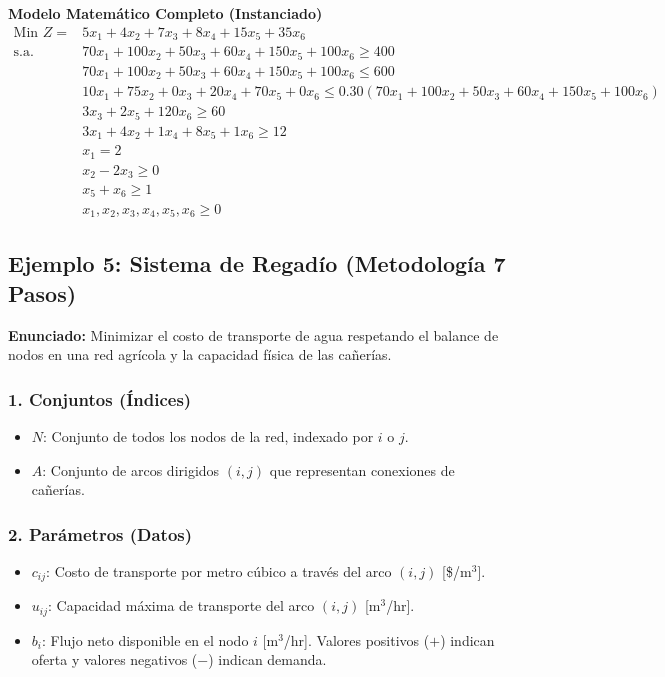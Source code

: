 \documentclass{article}
\begin{document}
	\vspace{0.5cm}
	\begin{center}
		\textbf{Modelo Matemático Completo (Instanciado)}
		$$\begin{aligned}
			\text{Min } Z = & 5x_1 + 4x_2 + 7x_3 + 8x_4 + 15x_5 + 35x_6 \\
			\text{s.a.} \quad & 70x_1 + 100x_2 + 50x_3 + 60x_4 + 150x_5 + 100x_6 \geq 400 \\
			& 70x_1 + 100x_2 + 50x_3 + 60x_4 + 150x_5 + 100x_6 \leq 600 \\
			& 10x_1 + 75x_2 + 0x_3 + 20x_4 + 70x_5 + 0x_6 \leq 0.30(70x_1 + 100x_2 + 50x_3 + 60x_4 + 150x_5 + 100x_6) \\
			& 3x_3 + 2x_5 + 120x_6 \geq 60 \\
			& 3x_1 + 4x_2 + 1x_4 + 8x_5 + 1x_6 \geq 12 \\
			& x_1 = 2 \\
			& x_2 - 2x_3 \geq 0 \\
			& x_5 + x_6 \geq 1 \\
			& x_1, x_2, x_3, x_4, x_5, x_6 \geq 0
		\end{aligned}$$
	\end{center}
	
	\newpage
	
	\subsection{Ejemplo 5: Sistema de Regadío (Metodología 7 Pasos)}
	
	\textbf{Enunciado:} Minimizar el costo de transporte de agua respetando el balance de nodos en una red agrícola y la capacidad física de las cañerías.
	
	\subsubsection*{1. Conjuntos (Índices)}
	\begin{itemize}
		\item $N$: Conjunto de todos los nodos de la red, indexado por $i$ o $j$.
		\item $A$: Conjunto de arcos dirigidos $(i,j)$ que representan conexiones de cañerías.
	\end{itemize}
	
	\subsubsection*{2. Parámetros (Datos)}
	\begin{itemize}
		\item $c_{ij}$: Costo de transporte por metro cúbico a través del arco $(i, j)$ [\$/$\text{m}^3$].
		\item $u_{ij}$: Capacidad máxima de transporte del arco $(i, j)$ [$\text{m}^3$/hr].
		\item $b_i$: Flujo neto disponible en el nodo $i$ [$\text{m}^3$/hr]. Valores positivos ($+$) indican oferta y valores negativos ($-$) indican demanda.
	\end{itemize}
	
\end{document}
